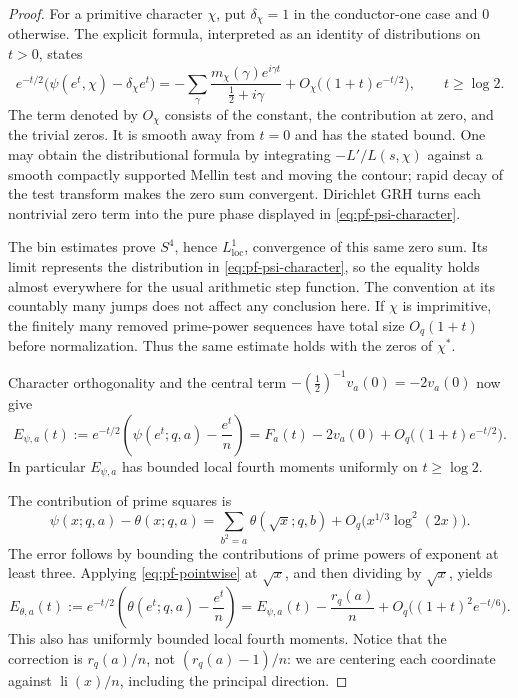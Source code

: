 \begin{proof}
For a primitive character $\chi$, put $\delta_\chi=1$ in the conductor-one
case and $0$ otherwise.  The explicit formula, interpreted as an identity
of distributions on $t>0$, states
\begin{equation}
\label{eq:pf-psi-character}
 e^{-t/2}\bigl(\psi(e^t,\chi)-\delta_\chi e^t\bigr)
 =-\sum_\gamma\frac{m_\chi(\gamma)e^{i\gamma t}}
                         {\tfrac12+i\gamma}
       +O_\chi\bigl((1+t)e^{-t/2}\bigr),\qquad t\geq\log2.
\end{equation}
The term denoted by $O_\chi$ consists of the constant, the contribution
at zero, and the trivial zeros.  It is smooth away from $t=0$ and has
the stated bound.  One may obtain the distributional formula by
integrating $-L'/L(s,\chi)$ against a smooth compactly supported Mellin
test and moving the contour; rapid decay of the test transform makes
the zero sum convergent.  Dirichlet GRH turns each nontrivial zero term
into the pure phase displayed in \eqref{eq:pf-psi-character}.

The bin estimates prove $S^4$, hence $L^1_{\mathrm{loc}}$, convergence
of this same zero sum.  Its limit represents the distribution in
\eqref{eq:pf-psi-character}, so the equality holds almost everywhere
for the usual arithmetic step function.  The convention at its
countably many jumps does not affect any conclusion here.  If $\chi$
is imprimitive, the finitely many removed prime-power sequences have
total size $O_q(1+t)$ before normalization.  Thus the same estimate
holds with the zeros of $\chi^*$.

Character orthogonality and the central term
$-(\tfrac12)^{-1}v_a(0)=-2v_a(0)$ now give
\begin{equation}
\label{eq:pf-psi}
 E_{\psi,a}(t):=e^{-t/2}\left(\psi(e^t;q,a)-\frac{e^t}{n}\right)
       =F_a(t)-2v_a(0)+O_q\bigl((1+t)e^{-t/2}\bigr).
\end{equation}
In particular $E_{\psi,a}$ has bounded local fourth moments uniformly
on $t\geq\log2$.

The contribution of prime squares is
\[
 \psi(x;q,a)-\theta(x;q,a)
       =\sum_{b^2=a}\theta(\sqrt{x};q,b)
                  +O_q\bigl(x^{1/3}\log^2(2x)\bigr).
\]
The error follows by bounding the contributions of prime powers of
exponent at least three.  Applying \eqref{eq:pf-pointwise} at
$\sqrt{x}$, and then dividing by $\sqrt{x}$, yields
\begin{equation}
\label{eq:pf-theta}
 E_{\theta,a}(t):=e^{-t/2}\left(\theta(e^t;q,a)-\frac{e^t}{n}\right)
 =E_{\psi,a}(t)-\frac{r_q(a)}n
                    +O_q\bigl((1+t)^2e^{-t/6}\bigr).
\end{equation}
This also has uniformly bounded local fourth moments.  Notice that
the correction is $r_q(a)/n$, not $(r_q(a)-1)/n$: we are centering each
coordinate against $\operatorname{li}(x)/n$, including the principal
direction.


\end{proof}
